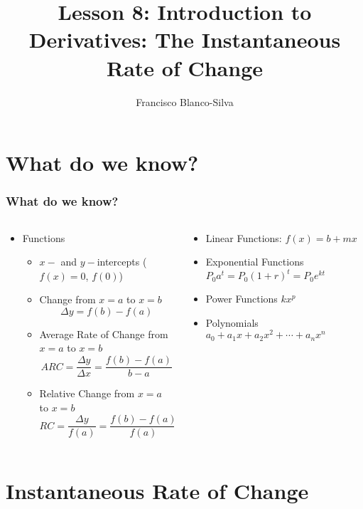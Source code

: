 \documentclass[9pt,xcolor=x11names,compress]{beamer}
\title{Lesson 8: Introduction to Derivatives: The Instantaneous Rate of Change}
\author[Francisco Blanco-Silva]{Francisco Blanco-Silva}
\institute[USC]{University of South Carolina}
\date{
\pgfdeclarelindenmayersystem{Hilbert curve}{
  \rule{L -> +RF-LFL-FR+}
  \rule{R -> -LF+RFR+FL-}}
	\begin{tikzpicture} 
    \shadedraw [bottom color=white, top color=DeepSkyBlue4, draw=black]
    [l-system={Hilbert curve, axiom=L, order=5, step=3pt, angle=90}]
    lindenmayer system; 
	\end{tikzpicture}
}
\begin{document}
\frame{\titlepage}

\section{What do we know?}
\begin{frame}
\frametitle{What do we know?}
\begin{columns}[T]
\begin{column}{0.6\linewidth}
\begin{itemize}
\item Functions
\begin{itemize}
\item $x-$ and $y-$\alert{intercepts} ($f(x)=0$, $f(0)$)
\item \alert{Change} from $x=a$ to $x=b$ 
\begin{equation*}
	\Delta y = f(b)-f(a)
\end{equation*}
\item \alert{Average Rate of Change} from $x=a$ to $x=b$
\begin{equation*}
ARC=\frac{\Delta y}{\Delta x}=\frac{f(b)-f(a)}{b-a} 
\end{equation*}
\item \alert{Relative Change} from $x=a$ to $x=b$
\begin{equation*}
RC=\frac{\Delta y}{f(a)}=\frac{f(b)-f(a)}{f(a)}
\end{equation*}
\end{itemize}
\end{itemize}
\end{column}
\begin{column}{0.4\linewidth}
\begin{itemize}
	\item Linear Functions: $f(x)=b+mx$
	\item Exponential Functions $P_0 a^t = P_0 (1+r)^t = P_0 e^{kt}$
	\item Power Functions \newline \makebox[1cm]{} $kx^p$
	\item Polynomials $a_0+a_1x+a_2x^2+\dotsb+a_n x^n$
\end{itemize}
\end{column}
\end{columns}
\end{frame}

\section{Instantaneous Rate of Change}
\end{document}
